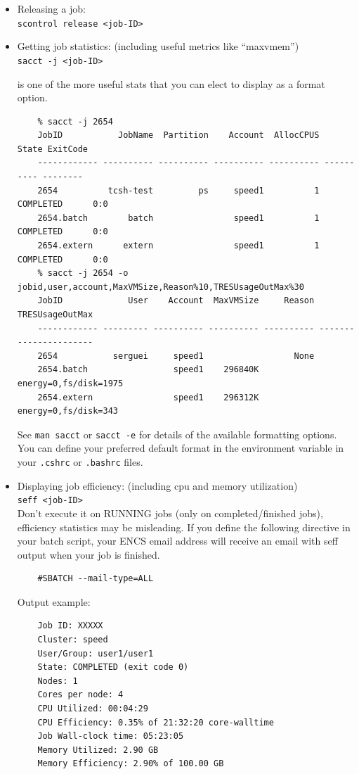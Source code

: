 \begin{itemize}
	\item Releasing a job:\\
	\texttt{scontrol release <job-ID>}

	\item Getting job statistics: (including useful metrics like ``maxvmem'')\\
	\texttt{sacct -j <job-ID>}
	
	 is one of the more useful stats that you can elect to display
	as a format option.
	\small
	\begin{verbatim}
	% sacct -j 2654
	JobID           JobName  Partition    Account  AllocCPUS      State ExitCode
	------------ ---------- ---------- ---------- ---------- ---------- --------
	2654          tcsh-test         ps     speed1          1  COMPLETED      0:0
	2654.batch        batch                speed1          1  COMPLETED      0:0
	2654.extern      extern                speed1          1  COMPLETED      0:0
	% sacct -j 2654 -o jobid,user,account,MaxVMSize,Reason%10,TRESUsageOutMax%30
	JobID             User    Account  MaxVMSize     Reason        TRESUsageOutMax
	------------ --------- ---------- ---------- ---------- ----------------------
	2654           serguei     speed1                  None
	2654.batch                 speed1    296840K             energy=0,fs/disk=1975
	2654.extern                speed1    296312K              energy=0,fs/disk=343
	\end{verbatim}
	\normalsize
	See \texttt{man sacct} or \texttt{sacct -e} for details of the available formatting options. 
	You can define your preferred default format in the  environment variable
	in your \texttt{.cshrc} or \texttt{.bashrc} files.

	\item Displaying job efficiency: (including cpu and memory utilization)\\
	\texttt{seff <job-ID>}\\
	Don't execute it on RUNNING jobs (only on completed/finished jobs), efficiency statistics may be misleading.
	If you define the following directive in your batch script, your ENCS email address will receive an email with seff output when your job is finished.
	\begin{verbatim}
	#SBATCH --mail-type=ALL        
	\end{verbatim}

	Output example:
	\small
	\begin{verbatim}
	Job ID: XXXXX
	Cluster: speed
	User/Group: user1/user1
	State: COMPLETED (exit code 0)
	Nodes: 1
	Cores per node: 4
	CPU Utilized: 00:04:29
	CPU Efficiency: 0.35% of 21:32:20 core-walltime
	Job Wall-clock time: 05:23:05
	Memory Utilized: 2.90 GB
	Memory Efficiency: 2.90% of 100.00 GB
	\end{verbatim}
	\normalsize
\end{itemize}


